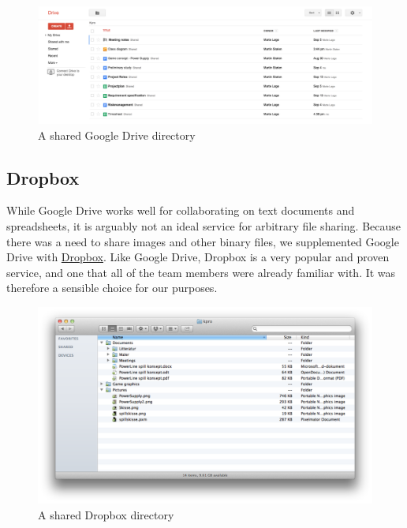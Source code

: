     \begin{figure}[htb]
      \centering
      \includegraphics[width=1\textwidth]{pictures/google_drive.png}
      \caption{A shared Google Drive directory}
    \end{figure}

\subsection{Dropbox}
    While Google Drive works well for collaborating on text documents and
    spreadsheets, it is arguably not an ideal service for arbitrary file
    sharing. Because there was a need to share images and other binary files, we
    supplemented Google Drive with \href{https://www.dropbox.com/}{Dropbox}. Like
    Google Drive, Dropbox is a very popular and proven service, and one that all of
    the team members were already familiar with. It was therefore a sensible choice
    for our purposes.

    \begin{figure}[htb]
      \centering
      \includegraphics[width=1\textwidth]{pictures/dropbox.png}
      \caption{A shared Dropbox directory}
    \end{figure}
